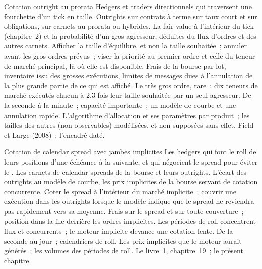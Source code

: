\begin{strategyfile}{Cotation outright au prorata}\label{strat:hf:futures-market-making:prorata}
 Hedgers et traders directionnels qui traversent une fourchette d'un tick en taille.
 Outrights sur contrats à terme sur taux court et sur obligations, sur carnets au prorata ou hybrides.
 La fair value à l'intérieur du tick (chapitre~2) et la probabilité d'un gros agresseur, déduites du flux d'ordres et des autres carnets.
 Afficher la taille d'équilibre, et non la taille souhaitée~; annuler avant les gros ordres prévus~; viser la priorité au premier ordre et celle du teneur de
marché principal, là où elle est disponible.
 Frais de la bourse par lot, inventaire issu des grosses exécutions, limites de messages dues à l'annulation de la plus grande partie de ce qui est affiché.
 Le très gros ordre, rare~: dix teneurs de marché exécutés chacun à 2.3 fois leur taille souhaitée par un seul agresseur.
 De la seconde à la minute~; capacité importante~; un modèle de courbe et une annulation rapide.
 L'algorithme d'allocation et ses paramètres par produit~; les tailles des autres (non observables) modélisées, et non supposées sans effet.
 Field et Large (2008)~; l'encadré daté.
\end{strategyfile}

\begin{strategyfile}{Cotation de calendar spread avec jambes implicites}\label{strat:hf:futures-market-making:spread}
 Les hedgers qui font le roll de leurs positions d'une échéance à la suivante, et qui négocient le spread pour éviter le .
 Les carnets de calendar spreads de la bourse et leurs outrights.
 L'écart des outrights au modèle de courbe, les prix implicites de la bourse servant de cotation concurrente.
 Coter le spread à l'intérieur du marché implicite~; couvrir une exécution dans les outrights lorsque le modèle indique que le spread ne
reviendra pas rapidement vers sa moyenne.
 Frais sur le spread et sur toute couverture~; position dans la file derrière les ordres implicites.
 Les périodes de roll concentrent flux et concurrents~; le moteur implicite devance une cotation lente.
 De la seconde au jour~; calendriers de roll.
 Les prix implicites que le moteur aurait générés~; les volumes des périodes de roll.
 Le livre~1, chapitre~19~; le présent chapitre.
\end{strategyfile}

